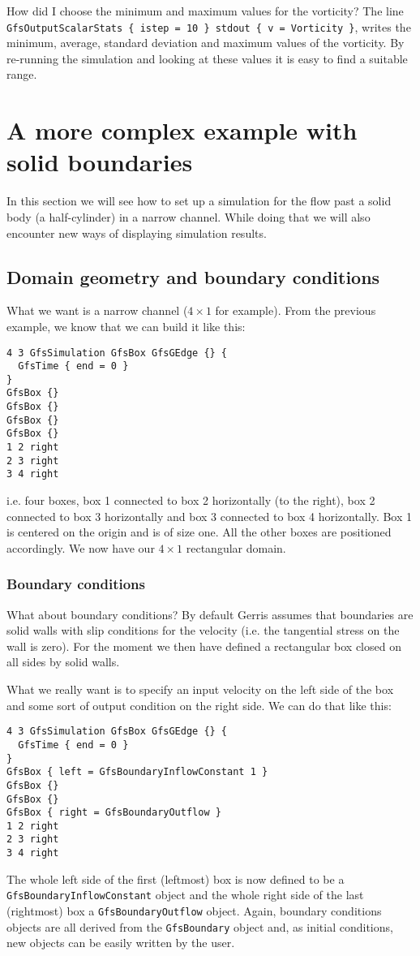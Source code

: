 \documentclass[a4paper]{article}
\begin{document}
How did I choose the minimum and maximum values for the vorticity? The 
line {\tt GfsOutputScalarStats \{ istep = 10 \} stdout \{ v = Vorticity
\}}, writes the minimum, average, standard deviation and maximum
values of the vorticity. By re-running the simulation and looking at
these values it is easy to find a suitable range.

\section{A more complex example with solid boundaries}

In this section we will see how to set up a simulation for the flow past 
a solid body (a half-cylinder) in a narrow channel. While doing that
we will also encounter new ways of displaying simulation results.

\subsection{Domain geometry and boundary conditions}

What we want is a narrow channel ($4\times 1$ for example). From the
previous example, we know that we can build it like this:
\begin{verbatim}
4 3 GfsSimulation GfsBox GfsGEdge {} {
  GfsTime { end = 0 }
}
GfsBox {}
GfsBox {}
GfsBox {}
GfsBox {}
1 2 right
2 3 right
3 4 right
\end{verbatim}
i.e. four boxes, box 1 connected to box 2 horizontally (to the right),
box 2 connected to box 3 horizontally and box 3 connected to box 4
horizontally. Box 1 is centered on the origin and is of size one. All
the other boxes are positioned accordingly. We now have our $4\times
1$ rectangular domain.

\subsubsection{Boundary conditions}

What about boundary conditions? By default Gerris assumes that
boundaries are solid walls with slip conditions for the velocity
(i.e. the tangential stress on the wall is zero). For the moment we
then have defined a rectangular box closed on all sides by solid
walls.

What we really want is to specify an input velocity on the left side
of the box and some sort of output condition on the right side. We can
do that like this:
\begin{verbatim}
4 3 GfsSimulation GfsBox GfsGEdge {} {
  GfsTime { end = 0 }
}
GfsBox { left = GfsBoundaryInflowConstant 1 }
GfsBox {}
GfsBox {}
GfsBox { right = GfsBoundaryOutflow }
1 2 right
2 3 right
3 4 right
\end{verbatim}
The whole left side of the first (leftmost) box is now defined to be a {\tt
GfsBoundaryInflowConstant} object and the whole right side of the last
(rightmost) box a {\tt GfsBoundaryOutflow} object. Again, boundary
conditions objects are all derived from the {\tt GfsBoundary} object
and, as initial conditions, new objects can be easily written by the
user.
\end{document}
